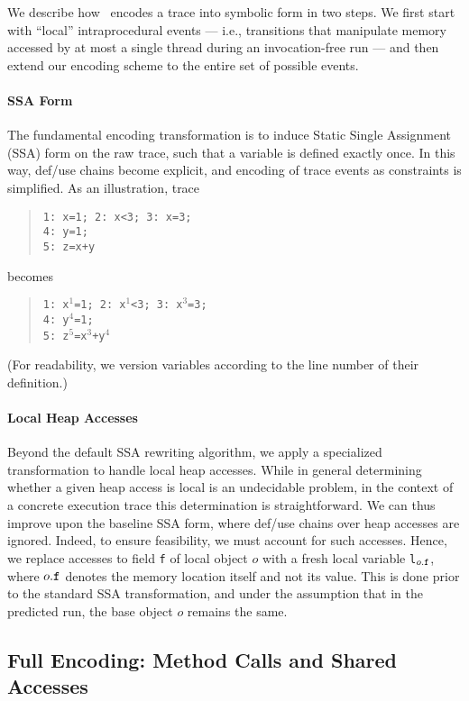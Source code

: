 We describe how \tool\ encodes a trace into symbolic form in two steps. We first start with ``local'' intraprocedural events --- i.e., 
transitions that manipulate memory accessed by at most a single thread during an invocation-free run --- and then extend our encoding scheme to the entire set of possible events.

\paragraph{SSA Form} The fundamental encoding transformation is to induce Static Single Assignment (SSA) form on the raw trace, such that
a variable is defined exactly once. In this way, def/use chains become explicit, and encoding of trace events as constraints is simplified. As an illustration, trace
\begin{quote}
	{\tt 1: x=1; 2: x<3; 3: x=3;} \\
	{\tt 4: y=1;} \\
	{\tt 5: z=x+y}
\end{quote}
becomes
\begin{quote}
	{\tt 1: x$^1$=1; 2: x$^1$<3; 3: x$^3$=3;} \\
	{\tt 4: y$^4$=1;} \\
	{\tt 5: z$^5$=x$^3$+y$^4$}
\end{quote}
(For readability, we version variables according to the line number of their definition.)

\paragraph{Local Heap Accesses} Beyond the default SSA rewriting algorithm, we apply a specialized transformation to handle local heap accesses. While in general determining whether a given heap access is local is an undecidable problem, in the context
of a concrete execution trace this determination is straightforward. We can thus improve upon the baseline SSA form, where def/use chains over heap accesses are ignored. Indeed, to ensure feasibility, we must account for such accesses. Hence, we replace accesses to field {\tt f} of local object $o$ with a fresh local variable {\tt l$_{o{\tt .f}}$}, where $o{\tt .f}$ denotes the memory location itself and not its value. This is done prior to the standard SSA transformation, and under the assumption that in the predicted run, the base object $o$ remains the same.

\subsection{Full Encoding: Method Calls and Shared Accesses}

